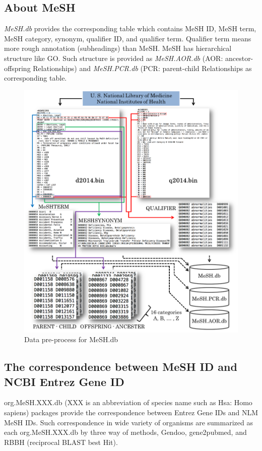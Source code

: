 \documentclass[11pt]{article}
\newcommand{\Rpackage}[1]{{\textit{#1}}}
\begin{document}
\subsection{About MeSH}
\Rpackage{MeSH.db} provides the corresponding table which contains MeSH ID, MeSH term, MeSH category, synonym, qualifier ID, and qualifier term. Qualifier term means more rough annotation (subheadings) than MeSH. MeSH has hierarchical structure like GO. Such structure is provided as \Rpackage{MeSH.AOR.db} (AOR: ancestor-offspring Relationships) and \Rpackage{MeSH.PCR.db} (PCR: parent-child Relationships as corresponding table.
\begin{figure}[ht]
\centering
\includegraphics[width=14.0cm]{fig2.png}
\caption{Data pre-process for MeSH.db}
\label{fig2}
\end{figure}
\clearpage
\subsection{The correspondence between MeSH ID and NCBI Entrez Gene ID}
org.MeSH.XXX.db (XXX is an abbreviation of species name such as Hsa: Homo sapiens) packages provide the correspondence between Entrez Gene IDs and NLM MeSH IDs. Such correspondence in wide variety of organisms are summarized as each org.MeSH.XXX.db by three way of methods, Gendoo\cite{Nakazato2009}, gene2pubmed, and RBBH (reciprocal BLAST best Hit).
\end{document}
